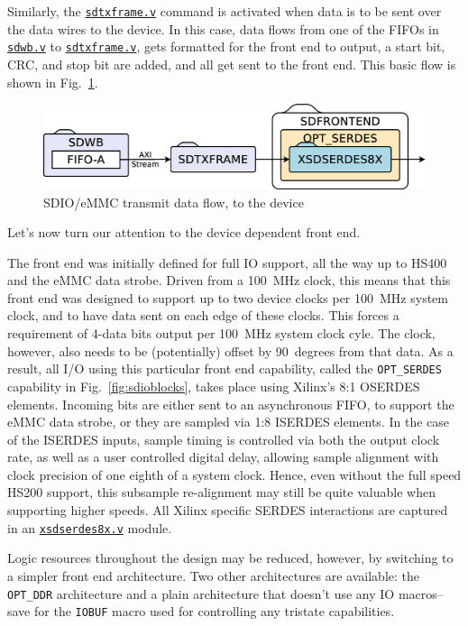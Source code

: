 \documentclass{gqtekspec}
\newcommand{\zhref}[2]{\href{#1}{\textcolor{dkblue}{#2}}}
\begin{document}
Similarly, the \zhref{../rtl/sdtxframe.v}{\tt sdtxframe.v} command is activated when data is to be
sent over the data wires to the device.  In this case, data flows from one
of the FIFOs in \zhref{../rtl/sdwb.v}{\tt sdwb.v} to \zhref{../rtl/sdtxframe.v}{\tt sdtxframe.v}, gets formatted for the
front end to output, a start bit, CRC, and stop bit are added, and all get
sent to the front end.  This basic flow is shown in Fig.~\ref{fig:sdiotxflow}.
\begin{figure}\begin{center}
\includegraphics[width=5.0in]{gfx/sdiotxflow.eps}
\caption{SDIO/eMMC transmit data flow, to the device}\label{fig:sdiotxflow}
\end{center}\end{figure}

Let's now turn our attention to the device dependent front end.

The front end was initially defined for full IO support, all the way up to
HS400 and the eMMC data strobe.  Driven from a 100~MHz clock, this means that
this front end was designed to support up to two device clocks per 100~MHz
system clock, and to have data sent on each edge of these clocks.  This
forces a requirement of 4-data bits output per 100~MHz system clock cyle.
The clock, however, also needs to be (potentially) offset by 90~degrees from
that data.  As a result, all I/O using this particular front end capability,
called the {\tt OPT\_SERDES} capability in Fig.~\ref{fig:sdioblocks}, takes
place using Xilinx's 8:1 OSERDES elements.  Incoming bits are either sent
to an asynchronous FIFO, to support the eMMC data strobe, or they are
sampled via 1:8 ISERDES elements.  In the case of the ISERDES inputs, sample
timing is controlled via both the output clock rate, as well as a user
controlled digital delay, allowing sample alignment with clock precision
of one eighth of a system clock.  Hence, even without the full speed HS200
support, this subsample re-alignment may still be quite valuable when supporting
higher speeds.  All Xilinx specific SERDES interactions are captured in an
\zhref{../rtl/xsdserdes8x.v}{\tt xsdserdes8x.v} module.

Logic resources throughout the design may be reduced, however, by switching
to a simpler front end architecture.  Two other architectures are available:
the {\tt OPT\_DDR} architecture and a plain architecture that doesn't use
any IO macros--save for the {\tt IOBUF} macro used for controlling any
tristate capabilities.
\end{document}
